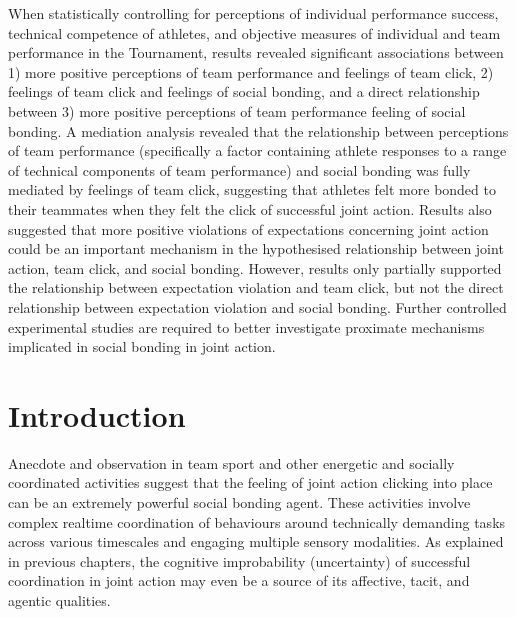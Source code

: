 \begin{CJK}{UTF8}{gbsn}
When statistically controlling for perceptions of individual performance success, technical competence of athletes, and objective measures of individual and team performance in the Tournament, results revealed significant associations between 1) more positive perceptions of team performance and feelings of team click, 2) feelings of team click and feelings of social bonding, and a direct relationship between 3) more positive perceptions of team performance feeling of social bonding.  A mediation analysis revealed that the relationship between perceptions of team performance (specifically a factor containing athlete responses to a range of technical components of team performance) and social bonding was fully mediated by feelings of team click, suggesting that athletes felt more bonded to their teammates when they felt the click of successful joint action. Results also suggested that more positive violations of expectations concerning joint action could be an important mechanism in the hypothesised relationship between joint action, team click, and social bonding. However, results only partially supported the relationship between expectation violation and team click, but not the direct relationship between expectation violation and social bonding. Further controlled experimental studies are required to better investigate proximate mechanisms implicated in social bonding in joint action.

\section{Introduction}
Anecdote and observation in team sport and other energetic and socially coordinated activities suggest that the feeling of joint action clicking into place can be an extremely powerful social bonding agent.  These activities involve complex realtime coordination of behaviours around technically demanding tasks across various timescales and engaging multiple sensory modalities.  As explained in previous chapters, the cognitive improbability (uncertainty) of successful coordination in joint action may even be a source of its affective, tacit, and agentic qualities.


\end{CJK}
